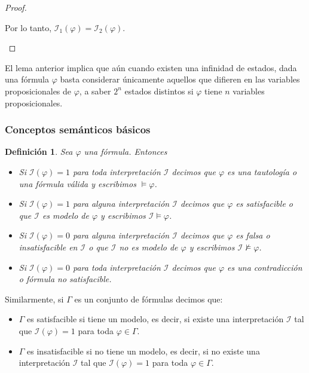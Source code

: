 \documentclass[letterpaper,11pt]{article}
\newtheorem{define}{Definición}[]
\begin{document}
\begin{proof}
\begin{itemize}
            Por lo tanto, 
            $\mathcal{I}_{1}(\varphi) = \mathcal{I}_{2}(\varphi)$.

        \end{itemize}
    \end{proof}

    El lema anterior implica que aún cuando existen una infinidad de estados,
    dada una fórmula $\varphi$ basta considerar únicamente aquellos que 
    difieren en las variables proposicionales de $\varphi$, a saber $2^{n}$
    estados distintos si $\varphi$ tiene $n$ variables proposicionales.

    \subsubsection{Conceptos semánticos básicos}
    \begin{define}
        Sea $\varphi$ una fórmula. Entonces 
        \begin{itemize}
            \item Si $\mathcal{I}(\varphi) = 1$ para toda interpretación 
            $\mathcal{I}$ decimos que $\varphi$ es una tautología o una 
            fórmula válida y escribimos $\models \varphi$. 
            \item Si $\mathcal{I}(\varphi) = 1$ para alguna interpretación
            $\mathcal{I}$ decimos que $\varphi$ es satisfacible o que
            $\mathcal{I}$ es modelo de $\varphi$ y escribimos 
            $\mathcal{I} \models \varphi$.
            \item Si $\mathcal{I}(\varphi) = 0$ para alguna interpretación
            $\mathcal{I}$ decimos que $\varphi$ es falsa o insatisfacible
            en $\mathcal{I}$ o que $\mathcal{I}$ no es modelo de $\varphi$
            y escribimos $\mathcal{I} \not \models \varphi$.
            \item Si $\mathcal{I}(\varphi) = 0$ para toda interpretación
            $\mathcal{I}$ decimos que $\varphi$ es una contradicción o fórmula
            no satisfacible. 
        \end{itemize}
    \end{define}

    \justify
    Similarmente, si $\Gamma$ es un conjunto de fórmulas decimos que:
    \begin{itemize}
        \item $\Gamma$ es satisfacible si tiene un modelo, es decir, si existe
        una interpretación $\mathcal{I}$ tal que $\mathcal{I}(\varphi) = 1$
        para toda $\varphi \in \Gamma$.
        \item $\Gamma$ es insatisfacible si no tiene un modelo, es decir, si 
        no existe una interpretación $\mathcal{I}$ tal que 
        $\mathcal{I}(\varphi) = 1$ para toda $\varphi \in \Gamma$.
    \end{itemize}
\end{document}
